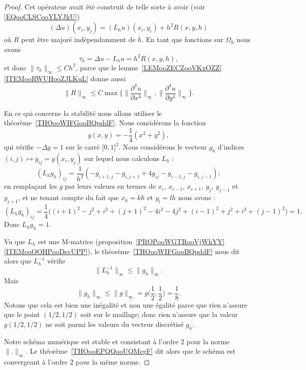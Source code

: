 \begin{proof}
	Cet opérateur avait été construit de telle sorte à avoir (voir \eqref{EQooCLSCooYLYJkU})
	\begin{equation}
		(\Delta u)(x_i,y_j)=(L_hu)(x_i,y_i)+h^2R(x,y,h)
	\end{equation}
	où \( R\) peut être majoré indépendamment de \( h\). En tant que fonctions sur \( \Omega_h\) nous avons
	\begin{equation}
		\tau_h=\Delta u-L_hu=h^2R(x,y,h),
	\end{equation}
	et donc \( \| \tau_h \|_{\infty}\leq Ch^2\), parce que le lemme~\ref{LEMooZECZooVKxOZZ}\ref{ITEMooRWUHooZJLKuL} donne aussi
	\begin{equation}
		\| R \|_{\infty}\leq C\max\{ \| \frac{ \partial^4u }{ \partial x^4 } \|_{\infty},\| \frac{ \partial^4u }{ \partial y^4 } \|_{\infty} \}.
	\end{equation}

	En ce qui concerne la stabilité nous allons utiliser le théorème~\ref{THOooWIFGooBQpddF}. Nous considérons la fonction
	\begin{equation}
		g(x,y)=-\frac{1}{ 4 }(x^2+y^2),
	\end{equation}
	qui vérifie \( -\Delta g=1\) sur le carré \( \mathopen[ 0 , 1 \mathclose]^2\). Nous considérons le vecteur \( g_h\) d'indices \( (i,j)\mapsto g_{ij}=g(x_i,y_j)\) sur lequel nous calculons \( L_h\) :
	\begin{equation}
		(L_hg_h)_{ij}=\frac{1}{ h^2 }(-g_{i+1,j}-g_{i,j+1}+4g_{ij}-g_{i-1,j}-g_{i,j-1});
	\end{equation}
	en remplaçant les \( g\) par leurs valeurs en termes de \( x_i\), \( x_{i-1}\), \( x_{i+1}\), \( y_j\), \( y_{j-1}\) et \( y_{j+1}\), et ne tenant compte du fait que \( x_k=kh\) et \( y_l=lh\) nous avons :
	\begin{equation}
		(L_hg_h)_{ij}=\frac{1}{ 4 }\big( (i+1)^2-j^2+i^2+(j+1)^2-4i^2-4j^2+(i-1)^2+j^2+i^2+(j-1)^2 \big)=1.
	\end{equation}
	Donc \( L_hg_h=1\).

	Vu que \( L_h\) est une M-matrice (proposition~\ref{PROPooWGTRooVjWhYY}\ref{ITEMooOOHPooDsvUPP}), le théorème~\ref{THOooWIFGooBQpddF} nous dit alors que \( L_h^{-1}\) vérifie
	\begin{equation}
		\| L_h^{-1} \|_{\infty}\leq \| g_h \|_{\infty}.
	\end{equation}
	Mais
	\begin{equation}
		\| g_h \|_{\infty}\leq \| g \|_{\infty}=g\big( \frac{ 1 }{2},\frac{ 1 }{2} \big)=\frac{1}{ 8 }.
	\end{equation}
	Notons que cela est bien une inégalité et non une égalité parce que rien n'assure que le point \( (1/2,1/2)\) soit sur le maillage; donc rien n'assure que la valeur \( g(1/2,1/2)\) ne soit parmi les valeurs du vecteur discrétisé \( g_h\).

	Notre schéma numérique est stable et consistant à l'ordre \( 2\) pour la norme \( \| . \|_{\infty}\). Le théorème~\ref{THOooEPQQooUQMcgF} dit alors que le schéma est convergeant à l'ordre \( 2\) pour la même norme.
\end{proof}

